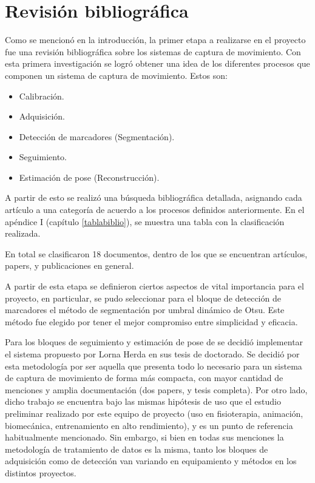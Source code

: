 \section{Revisión bibliográfica}
\label{invBiblio}

Como se mencionó en la introducción, la primer etapa a realizarse en el proyecto fue una revisión bibliográfica sobre los sistemas de captura de movimiento. Con esta primera investigación se logró obtener una idea de los diferentes procesos que componen un sistema de captura de movimiento. Estos son:

\begin{itemize}
	\item Calibración.
	\item Adquisición.
	\item Detección de marcadores (Segmentación).
	\item Seguimiento.
	\item Estimación de pose (Reconstrucción).
\end{itemize}

A partir de esto se realizó una búsqueda bibliográfica detallada, asignando cada artículo a una categoría de acuerdo a los procesos definidos anteriormente. En el apéndice I (capítulo \ref{tablabiblio}), se muestra una tabla con la clasificación realizada.

En total se clasificaron 18 documentos, dentro de los que se encuentran artículos, papers, y publicaciones en general. 

A partir de esta etapa se definieron ciertos aspectos de vital importancia para el proyecto, en particular, se pudo seleccionar para el bloque de detección de marcadores el método de segmentación por umbral dinámico de Otsu\cite{otsu}. Este método fue elegido por tener el mejor compromiso entre simplicidad y eficacia.

Para los bloques de seguimiento y estimación de pose de se decidió implementar el sistema propuesto por Lorna Herda en sus tesis de doctorado\cite{herda}. Se decidió por esta metodología por ser aquella que presenta todo lo necesario para un sistema de captura de movimiento de forma más compacta, con mayor cantidad de menciones y amplia documentación (dos papers, y tesis completa). Por otro lado, dicho trabajo se encuentra bajo las mismas hipótesis de uso que el estudio preliminar realizado por este equipo de proyecto (uso en fisioterapia, animación, biomecánica, entrenamiento en alto rendimiento), y es un punto de referencia habitualmente mencionado. Sin embargo, si bien en todas sus menciones la metodología de tratamiento de datos es la misma, tanto los bloques de adquisición como de detección van variando en equipamiento y métodos en los distintos proyectos.